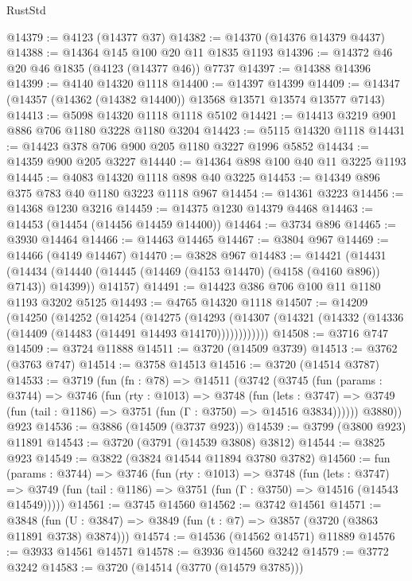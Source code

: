 \begin{lexlean}{RustStd}
\begin{coremodule}
@14379 := @4123 (@14377 @37)
@14382 := @14370 (@14376 @14379 @4437)
@14388 := @14364 @145 @100 @20 @11 @1835 @1193
@14396 := @14372 @46 @20 @46 @1835 (@4123 (@14377 @46)) @7737
@14397 := @14388 @14396
@14399 := @4140 @14320 @1118
@14400 := @14397 @14399
@14409 := @14347 (@14357 (@14362 (@14382 @14400)) @13568 @13571 @13574 @13577 @7143)
@14413 := @5098 @14320 @1118 @1118 @5102
@14421 := @14413 @3219 @901 @886 @706 @1180 @3228 @1180 @3204
@14423 := @5115 @14320 @1118
@14431 := @14423 @378 @706 @900 @205 @1180 @3227 @1996 @5852
@14434 := @14359 @900 @205 @3227
@14440 := @14364 @898 @100 @40 @11 @3225 @1193
@14445 := @4083 @14320 @1118 @898 @40 @3225
@14453 := @14349 @896 @375 @783 @40 @1180 @3223 @1118 @967
@14454 := @14361 @3223
@14456 := @14368 @1230 @3216
@14459 := @14375 @1230 @14379 @4468
@14463 := @14453 (@14454 (@14456 @14459 @14400))
@14464 := @3734 @896
@14465 := @3930 @14464
@14466 := @14463 @14465
@14467 := @3804 @967
@14469 := @14466 (@4149 @14467)
@14470 := @3828 @967
@14483 := @14421
    (@14431
      (@14434 (@14440 (@14445 (@14469 (@4153 @14470) (@4158 (@4160 @896)) @7143)) @14399))
      @14157)
@14491 := @14423 @386 @706 @100 @11 @1180 @1193 @3202 @5125
@14493 := @4765 @14320 @1118
@14507 := @14209
    (@14250
      (@14252
        (@14254
          (@14275
            (@14293
              (@14307 (@14321 (@14332 (@14336 (@14409 (@14483 (@14491 @14493 @14170))))))))))))
@14508 := @3716 @747
@14509 := @3724 @11888
@14511 := @3720 (@14509 @3739)
@14513 := @3762 (@3763 @747)
@14514 := @3758 @14513
@14516 := @3720 (@14514 @3787)
@14533 := @3719
    (fun (fn : @78) =>
    @14511
      (@3742
        (@3745
          (fun (params : @3744) =>
          @3746
            (fun (rty : @1013) =>
            @3748
              (fun (lets : @3747) =>
              @3749 (fun (tail : @1186) => @3751 (fun (Γ : @3750) => @14516 @3834))))))
        @3880))
    @923
@14536 := @3886 (@14509 (@3737 @923))
@14539 := @3799 (@3800 @923) @11891
@14543 := @3720 (@3791 (@14539 @3808) @3812)
@14544 := @3825 @923
@14549 := @3822 (@3824 @14544 @11894 @3780 @3782)
@14560 := fun (params : @3744) =>
  @3746
    (fun (rty : @1013) =>
    @3748
      (fun (lets : @3747) =>
      @3749 (fun (tail : @1186) => @3751 (fun (Γ : @3750) => @14516 (@14543 @14549)))))
@14561 := @3745 @14560
@14562 := @3742 @14561
@14571 := @3848
    (fun (U : @3847) => @3849 (fun (t : @7) => @3857 (@3720 (@3863 @11891 @3738) @3874)))
@14574 := @14536 (@14562 @14571) @11889
@14576 := @3933 @14561 @14571
@14578 := @3936 @14560 @3242
@14579 := @3772 @3242
@14583 := @3720 (@14514 (@3770 (@14579 @3785)))

\end{coremodule}
\end{lexlean}
